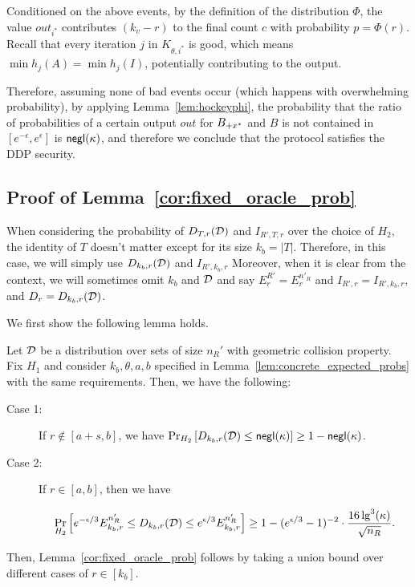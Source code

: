 Conditioned on the above events, by the definition of the distribution $\Phi$,
the value $out_{i^*}$ contributes $(k_v - r)$ to the final count $c$
with probability $p = \Phi(r)$.
%
Recall that every iteration $j$ in $K_{\theta,i^*}$ is good, which means $\min h_j(A) = \min h_j(I)$, potentially contributing to the output.


Therefore, assuming none of bad events occur (which happens with overwhelming probability),
by applying Lemma~\ref{lem:hockeyphi},
the probability that the ratio of probabilities of a certain output $out$
for $B_{+x^*}$ and $B$ is not contained in $[e^{-\epsilon}, e^{\epsilon}]$ is $\mathsf{negl}(\kappa)$, and therefore we conclude that the protocol satisfies the DDP security.

\subsection{Proof of Lemma~\ref{cor:fixed_oracle_prob}}



\label{sec:fixed_oracle_prob}
When considering the probability of $D_{T,r}({\cal D})$ and $I_{R', T, r}$ over the choice of $H_2$, the identity of $T$ doesn't matter except for its size $k_b = |T|$. Therefore, in this case, we will simply use $D_{k_b,r}({\cal D})$ and $I_{R', k_b, r}$
Moreover, when it is clear from the context, we will sometimes omit
$k_b$ and ${\cal D}$ and say $E^{R'}_{r} = E^{n'_R}_r$ and $I_{R',r} = I_{R', k_b, r}$, and 
%
$D_r = D_{k_b,r}({\cal D})$.  

We first show the following lemma holds. 

\begin{lemma} \label{lem:fixed_oracle_prob}
Let ${\cal D}$ be a distribution over sets of size $n_R'$ with geometric
collision property. Fix $H_1$ and consider $k_b, \theta, a, b$ specified in Lemma~\ref{lem:concrete_expected_probs} with the same requirements. 
Then, we have the following:

\begin{description}
\item[Case 1:] If $r \not \in [a+s, b]$, we have 
$\Pr_{H_2}\left[ D_{k_b,r}({\cal D}) \le \mathsf{negl}(\kappa) \right] \ge 1 - \mathsf{negl}(\kappa)$.
\item[Case 2:] If $r \in [a,b]$, then we have 

\[ \Pr_{H_2}\left[ e^{-\epsilon/3} E^{n'_R}_{k_b,r} \leq D_{k_b,r}({\cal D}) \leq e^{\epsilon/3} E^{n'_R}_{k_b,r} \right] \ge 1-(e^{\epsilon/3}-1)^{-2} \cdot \frac{16 \lg^3(\kappa)}{\sqrt{n_R}}. \]
\end{description}
\end{lemma}
%
Then, Lemma~\ref{cor:fixed_oracle_prob} follows by taking a union bound over different cases of $r \in [k_b]$. 
\qedhere


